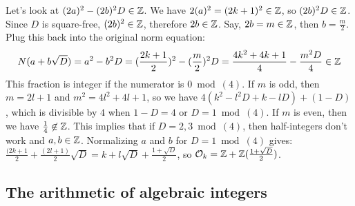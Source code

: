 \begin{outline}
                \3 Let's look at $(2a)^2-(2b)^2D\in\mathbb{Z}$. We have $2(a)^2 = (2k+1)^2\in\mathbb{Z}$, so $(2b)^2D\in\mathbb{Z}$. Since $D$ is square-free, $(2b)^2\in\mathbb{Z}$, therefore $2b\in\mathbb{Z}$.
                \3 Say, $2b=m\in\mathbb{Z}$, then $b=\frac{m}{2}$. Plug this back into the original norm equation:
                \2[] $$N(a+b\sqrt{D})=a^2-b^2D = (\frac{2k+1}{2})^2-(\frac{m}{2})^2D = \frac{4k^2+4k+1}{4}-\frac{m^2D}{4}\in \mathbb{Z}$$
            \2 This fraction is integer if the numerator is $0 \bmod (4)$. 
                \3 If $m$ is odd, then $m=2l+1$ and $m^2=4l^2+4l+1$, so we have $4(k^2-l^2D+k-lD)+(1-D)$, which is divisible by $4$ when $1-D=4$ or $D=1 \bmod (4)$.
                \3 If $m$ is even, then we have $\frac{1}{4}\not\in\mathbb{Z}$. This implies that if $D=2,3\bmod (4)$, then half-integers don't work and $a,b\in\mathbb{Z}$.
                \3 Normalizing $a$ and $b$ for $D=1\bmod (4)$ gives: $\frac{(2k+1}{2}+\frac{(2l+1)}{2}\sqrt{D} = k + l\sqrt{D}+ \frac{1+\sqrt{D}}{2}$, so $\mathcal{O}_k=\mathbb{Z}+\mathbb{Z}(\frac{1+\sqrt{D}}{2})$.
\end{outline}

\subsection{The arithmetic of algebraic integers}

